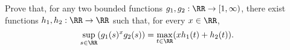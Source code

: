 Prove that, for any two bounded functions $g_1, g_2: \RR \to [1, \infty)$,
there exist functions $h_1, h_2: \RR \to \RR$ such that, for every $x \in \RR$,
\[
\sup_{s \in \RR} (g_1(s)^x g_2(s))  = \max_{t \in \RR} (x h_1(t) + h_2(t)).
\]
